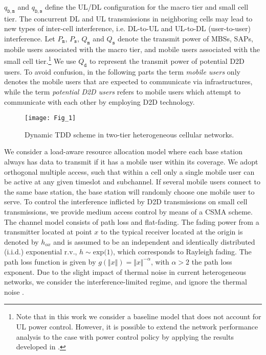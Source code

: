 \documentclass[twocolumn,english]{IEEEtran}
\theoremstyle{plain}
\theoremstyle{definition}
\begin{document}
$q_{\mathtt{D},\mathtt{m}}$ and $q_{\mathtt{D},\mathtt{s}}$ define
the UL/DL configuration for the macro tier and small cell tier. The
concurrent DL and UL transmissions in neighboring cells may lead to
new types of inter-cell interference, i.e. DL-to-UL and UL-to-DL (user-to-user)
interference. Let $P_{\mathtt{m}}$, $P_{\mathtt{s}}$, $Q_{\mathtt{m}}$
and $Q_{\mathtt{s}}$ denote the transmit power of MBSs, SAPs, mobile
users associated with the macro tier, and mobile users associated
with the small cell tier.\footnote{Note that in this work we consider a baseline model that does not
account for UL power control. However, it is possible to extend the
network performance analysis to the case with power control policy
by applying the results developed in \cite{SSFD,AMMS,AMUC,OTCR}. } We use $Q_{\mathtt{d}}$ to represent the transmit power of potential
D2D users. To avoid confusion, in the following parts the term \emph{mobile
users} only denotes the mobile users that are expected to communicate
via infrastructures, while the term \emph{potential D2D users }refers
to mobile users which attempt to communicate with each other by employing
D2D technology.

\begin{figure}[t]
\centering\texttt{[image: Fig\_1]}\protect\caption{\label{fig:Bandwidth Partition}Dynamic TDD scheme in two-tier heterogeneous
cellular networks.}
\end{figure}


We consider a load-aware resource allocation model where each base
station always has data to transmit if it has a mobile user within
its coverage. We adopt orthogonal multiple access, such that within
a cell only a single mobile user can be active at any given timeslot
and subchannel. If several mobile users connect to the same base station,
the base station will randomly choose one mobile user to serve. To
control the interference inflicted by D2D transmissions on small cell
transmissions, we provide medium access control by means of a CSMA
scheme. The channel model consists of path loss and flat-fading. The
fading power from a transmitter located at point $x$ to the typical
receiver located at the origin is denoted by $h_{ox}$ and is assumed
to be an independent and identically distributed (i.i.d.) exponential
r.v., $h\sim\textrm{exp(1)}$, which corresponds to Rayleigh fading.
The path loss function is given by $g\left(\Vert x\Vert\right)=\Vert x\Vert^{-\alpha}$,
with $\alpha>2$ the path loss exponent. Due to the slight impact
of thermal noise in current heterogeneous networks, we consider the
interference-limited regime, and ignore the thermal noise \cite{ATAT}.
\end{document}
